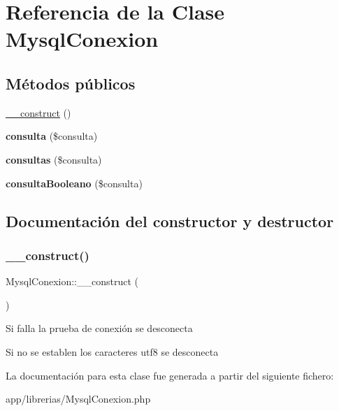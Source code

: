 \hypertarget{classMysqlConexion}{}\section{Referencia de la Clase Mysql\+Conexion}
\label{classMysqlConexion}
\subsection*{Métodos públicos}
\begin{DoxyCompactItemize}
\item 
\hyperlink{classMysqlConexion_a765f8681c53f4ac077d9af22aadab315}{\+\_\+\+\_\+construct} ()
\item 
\mbox{\label{classMysqlConexion_a3282d438405b630bc32ee3778ff54dd1}} 
{\bfseries consulta} (\$consulta)
\item 
\mbox{\label{classMysqlConexion_a8e4e09c1c5566758c5f25c163979ce72}} 
{\bfseries consultas} (\$consulta)
\item 
\mbox{\label{classMysqlConexion_a1841f5c8a418629e974106e12fe7e2c7}} 
{\bfseries consulta\+Booleano} (\$consulta)
\end{DoxyCompactItemize}


\subsection{Documentación del constructor y destructor}
\mbox{\label{classMysqlConexion_a765f8681c53f4ac077d9af22aadab315}} 
\subsubsection{\texorpdfstring{\+\_\+\+\_\+construct()}{\_\_construct()}}
{\footnotesize\ttfamily Mysql\+Conexion\+::\+\_\+\+\_\+construct (\begin{DoxyParamCaption}{ }\end{DoxyParamCaption})}

Si falla la prueba de conexión se desconecta

Si no se establen los caracteres utf8 se desconecta 

La documentación para esta clase fue generada a partir del siguiente fichero\+:\begin{DoxyCompactItemize}
\item 
app/librerias/Mysql\+Conexion.\+php\end{DoxyCompactItemize}

